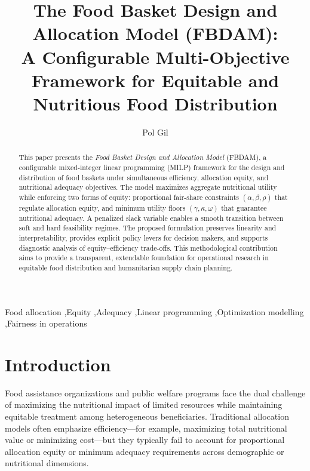 \documentclass[preprint,12pt]{elsarticle}
\begin{document}
\begin{frontmatter}

\title{The Food Basket Design and Allocation Model (FBDAM):\\
A Configurable Multi-Objective Framework for Equitable and Nutritious Food Distribution}

\author{Pol Gil}
\address{Zero Hunger Lab, Tilburg University, The Netherlands\\
\texttt{pol.gil@tilburguniversity.edu}}

\begin{abstract}
This paper presents the \emph{Food Basket Design and Allocation Model} (FBDAM), a configurable mixed-integer linear programming (MILP) framework for the design and distribution of food baskets under simultaneous efficiency, allocation equity, and nutritional adequacy objectives. The model maximizes aggregate nutritional utility while enforcing two forms of equity: proportional fair-share constraints $(\alpha, \beta, \rho)$ that regulate allocation equity, and minimum utility floors $(\gamma, \kappa, \omega)$ that guarantee nutritional adequacy. A penalized slack variable enables a smooth transition between soft and hard feasibility regimes. The proposed formulation preserves linearity and interpretability, provides explicit policy levers for decision makers, and supports diagnostic analysis of equity--efficiency trade-offs. This methodological contribution aims to provide a transparent, extendable foundation for operational research in equitable food distribution and humanitarian supply chain planning.
\end{abstract}

\begin{keyword}
Food allocation \sep Equity \sep Adequacy \sep Linear programming \sep Optimization modelling \sep Fairness in operations
\end{keyword}

\end{frontmatter}

\section{Introduction}
Food assistance organizations and public welfare programs face the dual challenge of maximizing the nutritional impact of limited resources while maintaining equitable treatment among heterogeneous beneficiaries. Traditional allocation models often emphasize efficiency---for example, maximizing total nutritional value or minimizing cost---but they typically fail to account for proportional allocation equity or minimum adequacy requirements across demographic or nutritional dimensions.
\end{document}
